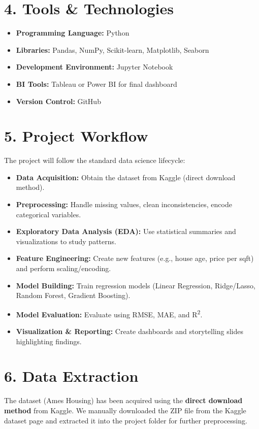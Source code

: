 \documentclass[12pt,a4paper]{article}
\begin{document}
\section*{4. Tools \& Technologies}
\begin{itemize}
    \item \textbf{Programming Language:} Python
    \item \textbf{Libraries:} Pandas, NumPy, Scikit-learn, Matplotlib, Seaborn
    \item \textbf{Development Environment:} Jupyter Notebook
    \item \textbf{BI Tools:} Tableau or Power BI for final dashboard
    \item \textbf{Version Control:} GitHub
\end{itemize}

\section*{5. Project Workflow}
The project will follow the standard data science lifecycle:

\begin{itemize}
    \item \textbf{Data Acquisition:} Obtain the dataset from Kaggle (direct download method).
    \item \textbf{Preprocessing:} Handle missing values, clean inconsistencies, encode categorical variables.
    \item \textbf{Exploratory Data Analysis (EDA):} Use statistical summaries and visualizations to study patterns.
    \item \textbf{Feature Engineering:} Create new features (e.g., house age, price per sqft) and perform scaling/encoding.
    \item \textbf{Model Building:} Train regression models (Linear Regression, Ridge/Lasso, Random Forest, Gradient Boosting).
    \item \textbf{Model Evaluation:} Evaluate using RMSE, MAE, and R\textsuperscript{2}.
    \item \textbf{Visualization \& Reporting:} Create dashboards and storytelling slides highlighting findings.
\end{itemize}

\section*{6. Data Extraction}
The dataset (Ames Housing) has been acquired using the \textbf{direct download method} from Kaggle.  
We manually downloaded the ZIP file from the Kaggle dataset page and extracted it into the project folder for further preprocessing.  
\end{document}
